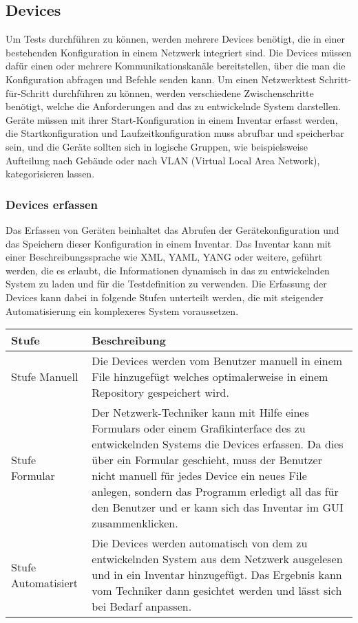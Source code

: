 \documentclass[
	ngerman,
	toc=listof, %
	toc=bibliography, %
	footnotes=multiple, %
	parskip=half, %
	numbers=noendperiod %
]{scrartcl}
\begin{document}
	\subsection{Devices}
	Um Tests durchführen zu können, werden mehrere Devices benötigt, die in einer bestehenden Konfiguration in einem Netzwerk integriert sind.
	Die Devices müssen dafür einen oder mehrere Kommunikationskanäle bereitstellen, über die man die Konfiguration abfragen und Befehle senden kann.
	Um einen Netzwerktest Schritt-für-Schritt durchführen zu können, werden verschiedene Zwischenschritte benötigt, welche die Anforderungen and das zu entwickelnde System darstellen.
	Geräte müssen mit ihrer Start-Konfiguration in einem Inventar erfasst werden, die Startkonfiguration und Laufzeitkonfiguration muss abrufbar und speicherbar sein,
	und die Geräte sollten sich in logische Gruppen, wie beispielsweise Aufteilung nach Gebäude oder nach VLAN (Virtual Local Area Network), kategorisieren lassen.

		\subsubsection{Devices erfassen}
			Das Erfassen von Geräten beinhaltet das Abrufen der Gerätekonfiguration und das Speichern dieser Konfiguration in einem Inventar. 
			Das Inventar kann mit einer Beschreibungssprache wie XML, YAML, YANG oder weitere, geführt werden, die es erlaubt, die Informationen dynamisch in das zu entwickelnden System zu laden und für die Testdefinition zu verwenden.
			Die Erfassung der Devices kann dabei in folgende Stufen unterteilt werden, die mit steigender Automatisierung ein komplexeres System voraussetzen.

			\begin{tabularx}{\textwidth}{lX}
				\toprule
				Stufe & Beschreibung\\
				\midrule
				Stufe Manuell & Die Devices werden vom Benutzer manuell in einem File hinzugefügt welches optimalerweise in einem Repository gespeichert wird. \\
				\midrule
				Stufe Formular & Der Netzwerk-Techniker kann mit Hilfe eines Formulars oder einem Grafikinterface des zu entwickelnden Systems die Devices erfassen. Da dies über ein Formular geschieht, muss der Benutzer nicht manuell für jedes Device ein neues File anlegen, sondern das Programm erledigt all das für den Benutzer und er kann sich das Inventar im GUI zusammenklicken.\\
				\midrule
				Stufe Automatisiert & Die Devices werden automatisch von dem zu entwickelnden System aus dem Netzwerk ausgelesen und in ein Inventar hinzugefügt. Das Ergebnis kann vom Techniker dann gesichtet werden und lässt sich bei Bedarf anpassen. \\
				\bottomrule
			\end{tabularx}
			\newpage
\end{document}
